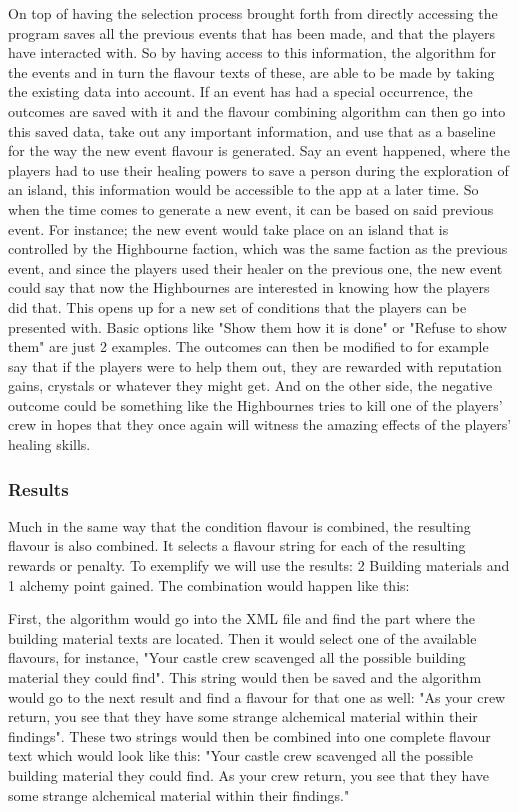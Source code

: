 On top of having the selection process brought forth from directly accessing the program saves all the previous events that has been made, and that the players have interacted with. So by having access to this information, the algorithm for the events and in turn the flavour texts of these, are able to be made by taking the existing data into account. If an event has had a special occurrence, the outcomes are saved with it and the flavour combining algorithm can then go into this saved data, take out any important information, and use that as a baseline for the way the new event flavour is generated. Say an event happened, where the players had to use their healing powers to save a person during the exploration of an island, this information would be accessible to the app at a later time. So when the time comes to generate a new event, it can be based on said previous event. For instance; the new event would take place on an island that is controlled by the Highbourne faction, which was the same faction as the previous event, and since the players used their healer on the previous one, the new event could say that now the Highbournes are interested in knowing how the players did that. This opens up for a new set of conditions that the players can be presented with. Basic options like "Show them how it is done" or "Refuse to show them" are just 2 examples. The outcomes can then be modified to for example say that if the players were to help them out, they are rewarded with reputation gains, crystals or whatever they might get. And on the other side, the negative outcome could be something like the Highbournes tries to kill one of the players' crew in hopes that they once again will witness the amazing effects of the players' healing skills.
\subsubsection{Results}
Much in the same way that the condition flavour is combined, the resulting flavour is also combined. It selects a flavour string for each of the resulting rewards or penalty. To exemplify we will use the results: 2 Building materials and 1 alchemy point gained.
The combination would happen like this:

First, the algorithm would go into the XML file and find the part where the building material texts are located. Then it would select one of the available flavours, for instance, "Your castle crew scavenged all the possible building material they could find". This string would then be saved and the algorithm would go to the next result and find a flavour for that one as well: "As your crew return, you see that they have some strange alchemical material within their findings". 
These two strings would then be combined into one complete flavour text which would look like this: "Your castle crew scavenged all the possible building material they could find. As your crew return, you see that they have some strange alchemical material within their findings."

